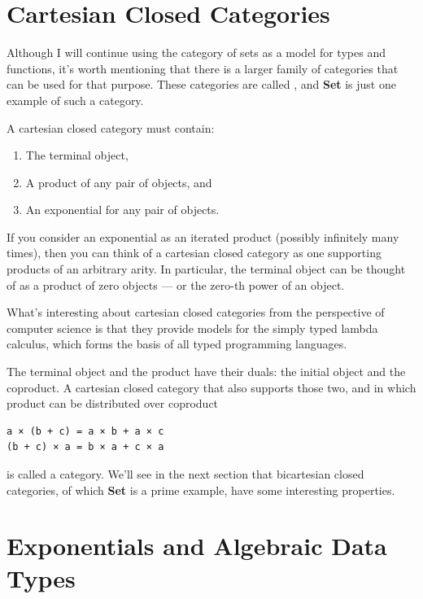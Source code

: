 \section{Cartesian Closed
Categories}\label{cartesian-closed-categories}

Although I will continue using the category of sets as a model for types
and functions, it's worth mentioning that there is a larger family of
categories that can be used for that purpose. These categories are
called , and \textbf{Set} is just one example of
such a category.

A cartesian closed category must contain:

\begin{enumerate}
\tightlist
\item
  The terminal object,
\item
  A product of any pair of objects, and
\item
  An exponential for any pair of objects.
\end{enumerate}
If you consider an exponential as an iterated product (possibly
infinitely many times), then you can think of a cartesian closed
category as one supporting products of an arbitrary arity. In
particular, the terminal object can be thought of as a product of zero
objects --- or the zero-th power of an object.

What's interesting about cartesian closed categories from the
perspective of computer science is that they provide models for the
simply typed lambda calculus, which forms the basis of all typed
programming languages.

The terminal object and the product have their duals: the initial object
and the coproduct. A cartesian closed category that also supports those
two, and in which product can be distributed over coproduct

\begin{Verbatim}[commandchars=\\\{\}]
a × (b + c) = a × b + a × c
(b + c) × a = b × a + c × a
\end{Verbatim}
is called a  category. We'll see in the next
section that bicartesian closed categories, of which \textbf{Set} is a
prime example, have some interesting properties.

\section{Exponentials and Algebraic Data
Types}\label{exponentials-and-algebraic-data-types}

